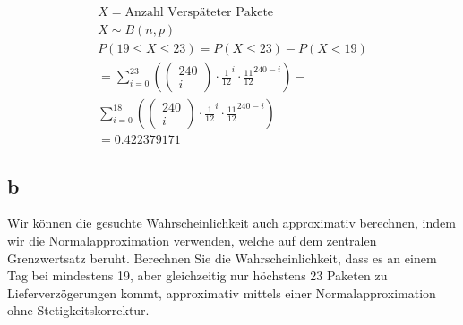 \begin{align*}
    X = \text{Anzahl Verspäteter Pakete}                                                               \\
    X \sim B(n, p)                                                                                     \\
    P(19 \leq X \leq 23) = P(X \leq 23) - P(X < 19)                                                    \\
    = \sum_{i = 0}^{23}\left(\begin{pmatrix}
                                 240 \\ i
                             \end{pmatrix} \cdot \frac{1}{12}^i \cdot \frac{11}{12}^{240 - i}\right) - \\
    \sum_{i = 0}^{18}\left(\begin{pmatrix}
                               240 \\ i
                           \end{pmatrix} \cdot \frac{1}{12}^i \cdot \frac{11}{12}^{240 - i}\right)     \\
    = 0.422379171
\end{align*}

\subsection{b}

Wir können die gesuchte Wahrscheinlichkeit auch approximativ berechnen, indem
wir die Normalapproximation verwenden, welche auf dem zentralen Grenzwertsatz
beruht. Berechnen Sie die Wahrscheinlichkeit, dass es an einem Tag bei
mindestens 19, aber gleichzeitig nur höchstens 23 Paketen zu
Lieferverzögerungen kommt, approximativ mittels einer Normalapproximation ohne
Stetigkeitskorrektur.

